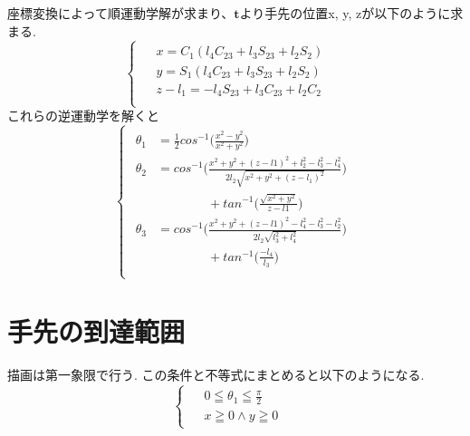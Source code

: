 \documentclass[10pt]{jarticle}
\begin{document}
	座標変換によって順運動学解が求まり、$\boldsymbol{t}$より手先の位置x, y, zが以下のように求まる.
	\begin{equation}
		\left\{
			\begin{array}{c}
			\begin{split}
				&  x  =  C_1(l_4C_{23}  +  l_3S_{23}  +  l_2S_2)\quad \\
				&  y  =  S_1(l_4C_{23}  +  l_3S_{23}  +  l_2S_2)\quad \\
				&  z  -  l_1  =  -l_4S_{23}  +  l_3C_{23}  +  l_2C_2\quad \\
			\end{split}
		\end{array}
		\right.
	\end{equation}
	これらの逆運動学を解くと
	\begin{equation}
		\left\{
			\begin{array}{c}
			\begin{split}
				\theta_1  &  =\frac{1}{2}  cos^{-1}\biggl( \frac{x^2-y^2}{x^2+y^2} \biggr) \\
				\theta_2  &  = cos^{-1}\biggl( \frac{x^2+y^2+(z-l1)^2  +  l_2^2-l_3^2-l_4^2}{2l_2\sqrt{x^2+y^2+(z-l_1)^2}} \biggr)\\
				&\qquad\qquad  +  tan^{-1}\biggl( \frac{\sqrt{x^2+y^2}}{z-l1}\biggr) \\
				\theta_3  &  =cos^{-1}\biggl( \frac{x^2+y^2+(z-l1)^2 - l_4^2-l_3^2-l_2^2}{2l_2\sqrt{l_3^2+l_4^2}}\biggr)\\
				&\qquad\qquad + tan^{-1}\biggl( \frac{-l_4}{l_3}\biggr)\\
			\end{split}
			\end{array}
		\right.
	\end{equation}

	\section{手先の到達範囲}
	描画は第一象限で行う.
	この条件と不等式にまとめると以下のようになる.
	\begin{equation*}
		\left\{
			\begin{array}{c}
				\begin{split}
					&  0  \leqq  \theta_1  \leqq  \frac{\pi}{2}  &  \\
					&  x  \geqq  0  \land  y  \geqq  0
				\end{split}
			\end{array}
		\right.
	\end{equation*}
\end{document}
